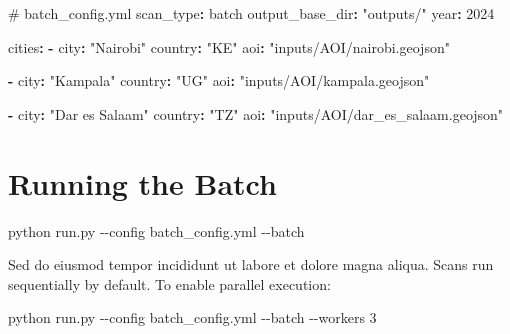 \documentclass[
  letterpaper,
  DIV=11,
  numbers=noendperiod]{scrreprt}
\newenvironment{Shaded}{\begin{snugshade}}{\end{snugshade}}
\newcommand{\AttributeTok}[1]{\textcolor[rgb]{0.40,0.45,0.13}{#1}}
\newcommand{\CommentTok}[1]{\textcolor[rgb]{0.37,0.37,0.37}{#1}}
\newcommand{\DecValTok}[1]{\textcolor[rgb]{0.68,0.00,0.00}{#1}}
\newcommand{\ExtensionTok}[1]{\textcolor[rgb]{0.00,0.23,0.31}{#1}}
\newcommand{\FunctionTok}[1]{\textcolor[rgb]{0.28,0.35,0.67}{#1}}
\newcommand{\KeywordTok}[1]{\textcolor[rgb]{0.00,0.23,0.31}{\textbf{#1}}}
\newcommand{\NormalTok}[1]{\textcolor[rgb]{0.00,0.23,0.31}{#1}}
\newcommand{\StringTok}[1]{\textcolor[rgb]{0.13,0.47,0.30}{#1}}
\begin{document}
\begin{Shaded}
\begin{Highlighting}[]
\CommentTok{\# batch\_config.yml}
\FunctionTok{scan\_type}\KeywordTok{:}\AttributeTok{ batch}
\FunctionTok{output\_base\_dir}\KeywordTok{:}\AttributeTok{ }\StringTok{"outputs/"}
\FunctionTok{year}\KeywordTok{:}\AttributeTok{ }\DecValTok{2024}

\FunctionTok{cities}\KeywordTok{:}
\AttributeTok{  }\KeywordTok{{-}}\AttributeTok{ }\FunctionTok{city}\KeywordTok{:}\AttributeTok{ }\StringTok{"Nairobi"}
\AttributeTok{    }\FunctionTok{country}\KeywordTok{:}\AttributeTok{ }\StringTok{"KE"}
\AttributeTok{    }\FunctionTok{aoi}\KeywordTok{:}\AttributeTok{ }\StringTok{"inputs/AOI/nairobi.geojson"}

\AttributeTok{  }\KeywordTok{{-}}\AttributeTok{ }\FunctionTok{city}\KeywordTok{:}\AttributeTok{ }\StringTok{"Kampala"}
\AttributeTok{    }\FunctionTok{country}\KeywordTok{:}\AttributeTok{ }\StringTok{"UG"}
\AttributeTok{    }\FunctionTok{aoi}\KeywordTok{:}\AttributeTok{ }\StringTok{"inputs/AOI/kampala.geojson"}

\AttributeTok{  }\KeywordTok{{-}}\AttributeTok{ }\FunctionTok{city}\KeywordTok{:}\AttributeTok{ }\StringTok{"Dar es Salaam"}
\AttributeTok{    }\FunctionTok{country}\KeywordTok{:}\AttributeTok{ }\StringTok{"TZ"}
\AttributeTok{    }\FunctionTok{aoi}\KeywordTok{:}\AttributeTok{ }\StringTok{"inputs/AOI/dar\_es\_salaam.geojson"}
\end{Highlighting}
\end{Shaded}

\section{Running the Batch}\label{running-the-batch}

\begin{Shaded}
\begin{Highlighting}[]
\ExtensionTok{python}\NormalTok{ run.py }\AttributeTok{{-}{-}config}\NormalTok{ batch\_config.yml }\AttributeTok{{-}{-}batch}
\end{Highlighting}
\end{Shaded}

Sed do eiusmod tempor incididunt ut labore et dolore magna aliqua. Scans
run sequentially by default. To enable parallel execution:

\begin{Shaded}
\begin{Highlighting}[]
\ExtensionTok{python}\NormalTok{ run.py }\AttributeTok{{-}{-}config}\NormalTok{ batch\_config.yml }\AttributeTok{{-}{-}batch} \AttributeTok{{-}{-}workers}\NormalTok{ 3}
\end{Highlighting}
\end{Shaded}
\end{document}
